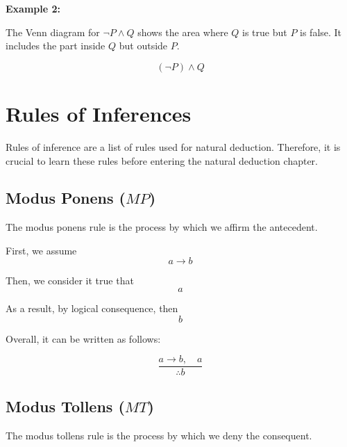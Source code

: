 \documentclass[12pt,a4paper,openany]{article}
\begin{document}
\textbf{Example 2:} 

The Venn diagram for \(\neg P \wedge Q\) shows the area where \(Q\) is true but \(P\) is false. It includes the part inside \(Q\) but outside \(P\).

\[
(\neg P) \wedge Q
\]

\begin{center}
\end{center}


\section{Rules of Inferences}

Rules of inference are a list of rules used for natural deduction. Therefore, it is crucial to learn these rules before entering the natural deduction chapter.

\subsection{Modus Ponens (\(MP\))}\label{modus-ponens-mp}

The modus ponens rule is the process by which we affirm the antecedent.

First, we assume \[a \to b\]

Then, we consider it true that \[a\]

As a result, by logical consequence, then \[b\]

Overall, it can be written as follows:

\[\frac{a \to b, \quad a}{\therefore b}\]

\subsection{Modus Tollens (\(MT\))}\label{modus-tollens-mt}

The modus tollens rule is the process by which we deny the consequent.
\end{document}
